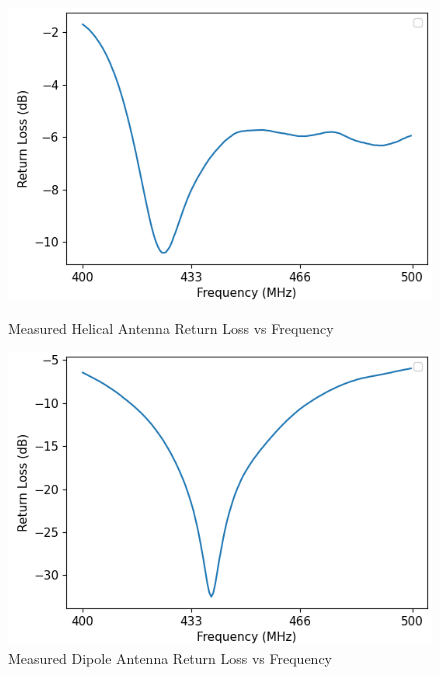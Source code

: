 \begin{figure}[!tb]
  \begin{minipage}{.49\textwidth}
    \centering
    \includegraphics[width=1.0\linewidth]{helicalReturnLoss}
    \caption{Measured Helical Antenna Return Loss vs Frequency}
    \label{fig:helicalReturnLoss}
  \end{minipage}
  \begin{minipage}{.49\textwidth}
    \centering
    \includegraphics[width=1.0\linewidth]{dipoleReturnLoss}
    \caption{Measured Dipole Antenna Return Loss vs Frequency}
    \label{fig:dipoleReturnLoss}
  \end{minipage}
\end{figure}
